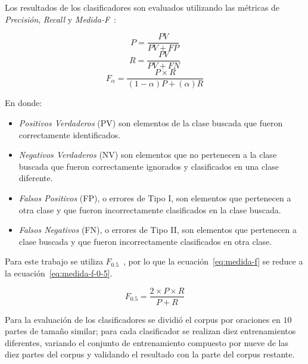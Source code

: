 \documentclass[runningheads,a4paper]{llncs}
\begin{document}
Los resultados de los clasificadores son evaluados utilizando las métricas de \emph{Precisión}, \emph{Recall} y \emph{Medida-F}~\cite{BIRD09}:

\begin{equation}
	\label{eq:precision}
	P = \frac{PV}{PV + FP}
\end{equation}
\begin{equation}
	\label{eq:recall}
	R = \frac{PV}{PV + FN}
\end{equation}
\begin{equation}
	\label{eq:medida-f}
	F_{\alpha} = \frac{P \times R}{(1 - \alpha)P + (\alpha)R}
\end{equation}

En donde:
\begin{itemize}
\item{\emph{Positivos Verdaderos} (PV) son elementos de la clase buscada que fueron correctamente identificados.}
\item{\emph{Negativos Verdaderos} (NV) son elementos que no pertenecen a la clase buscada que fueron correctamente ignorados y clasificados en una clase diferente.}
\item{\emph{Falsos Positivos} (FP), o errores de Tipo I, son elementos que pertenecen a otra clase y que fueron incorrectamente clasificados en la clase buscada.}
\item{\emph{Falsos Negativos} (FN), o errores de Tipo II, son elementos que pertenecen a clase buscada y que fueron incorrectamente clasificados en otra clase.}
\end{itemize}

Para este trabajo se utiliza $F_{0.5}$~\cite{MAKHOUL99}, por lo que la ecuación~\ref{eq:medida-f} se reduce a la ecuación~\ref{eq:medida-f-0-5}.

\begin{equation}
	\label{eq:medida-f-0-5}
	F_{0.5} = \frac{2 \times P \times R}{P + R}
\end{equation}

Para la evaluación de los clasificadores se dividió el corpus por oraciones en $10$ partes de tamaño similar; para cada clasificador se realizan diez entrenamientos diferentes, variando el conjunto de entrenamiento compuesto por nueve de las diez partes del corpus y validando el resultado con la parte del corpus restante. 
\end{document}
